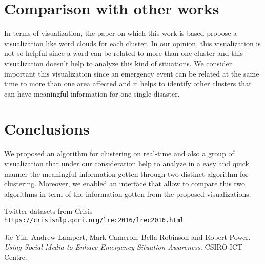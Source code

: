 \documentclass{article}
\begin{document}
\section{Comparison with other works}
In terms of visualization, the paper on which this work is based propose a visualization like word clouds for each cluster. In our opinion, this visualization is not so helpful since a word can be related to more than one cluster and this visualization doesn't help to analyze this kind of situations. We consider important this visualization since an emergency event can be related at the same time to more than one area affected and it helps to identify other clusters that can have meaningful information for one single disaster. 
\section{Conclusions}
We proposed an algorithm for clustering on real-time and also a group of visualization that under our consideration help to analyze in a easy and quick manner the meaningful information gotten through two distinct algorithm for clustering. Moreover, we enabled an interface that allow to compare this two algorithms in term of the information gotten from the proposed visualizations.

\begin{thebibliography}{9}
Twitter datasets from Crisis
\\\texttt{https://crisisnlp.qcri.org/lrec2016/lrec2016.html}

Jie Yin, Andrew Lampert, Mark Cameron, Bella Robinson and Robert Power. 
\textit{Using Social Media to Enhace Emergency Situation Awareness}. CSIRO ICT Centre.
\end{thebibliography}
\end{document}

